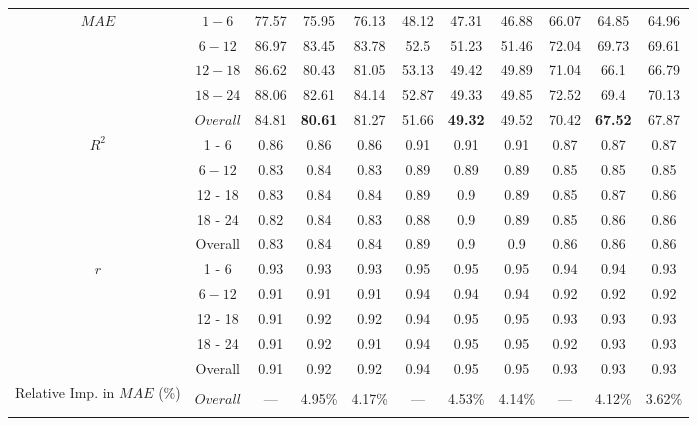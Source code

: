 \begin{table}[h]
\begin{center}
\begin{tabular}{@{}ccccccccccc@{}}
    \midrule
    \multirow{5}{*}{$MAE$}  & $1 - 6$  & 77.57 & 75.95 & 76.13 & 48.12 & 47.31 & 46.88 & 66.07 & 64.85 & 64.96 \\
           & $6 - 12$       & 86.97 & 83.45 & 83.78 & 52.5  & 51.23 & 51.46 & 72.04 & 69.73 & 69.61 \\
           & $12 - 18$      & 86.62 & 80.43 & 81.05 & 53.13 & 49.42 & 49.89 & 71.04 & 66.1  & 66.79 \\
           & $18 - 24$      & 88.06 & 82.61 & 84.14 & 52.87 & 49.33 & 49.85 & 72.52 & 69.4  & 70.13 \\
           & $Overall$      & 84.81 & \textbf{80.61} & 81.27 & 51.66 & \textbf{49.32} & 49.52 & 70.42 & \textbf{67.52} & 67.87 \\
    \midrule
    \multirow{5}{*}{$R^2$}  & 1 - 6 & 0.86  & 0.86  & 0.86  & 0.91  & 0.91  & 0.91  & 0.87  & 0.87  & 0.87 \\
           & $6 - 12$   & 0.83  & 0.84  & 0.83  & 0.89  & 0.89  & 0.89  & 0.85  & 0.85  & 0.85 \\
           & 12 - 18    & 0.83  & 0.84  & 0.84  & 0.89  & 0.9   & 0.89  & 0.85  & 0.87  & 0.86 \\
           & 18 - 24    & 0.82  & 0.84  & 0.83  & 0.88  & 0.9   & 0.89  & 0.85  & 0.86  & 0.86 \\
           & Overall    & 0.83  & 0.84  & 0.84  & 0.89  & 0.9   & 0.9   & 0.86  & 0.86  & 0.86 \\                     
    \midrule
    \multirow{5}{*}{$r$}  & 1 - 6 & 0.93  & 0.93  & 0.93  & 0.95  & 0.95  & 0.95  & 0.94  & 0.94  & 0.93 \\
           & $6 - 12$   & 0.91  & 0.91  & 0.91  & 0.94  & 0.94  & 0.94  & 0.92  & 0.92  & 0.92 \\
           & 12 - 18    & 0.91  & 0.92  & 0.92  & 0.94  & 0.95  & 0.95  & 0.93  & 0.93  & 0.93 \\
           & 18 - 24    & 0.91  & 0.92  & 0.91  & 0.94  & 0.95  & 0.95  & 0.92  & 0.93  & 0.93 \\
           & Overall    & 0.91  & 0.92  & 0.92  & 0.94  & 0.95  & 0.95  & 0.93  & 0.93  & 0.93 \\                     
    \bottomrule
    \multirow{3}{5em}{Relative Imp. in $MAE$ (\%)} & & & & & & & & & & \\
    & $Overall$ & --- & 4.95\% & 4.17\% & --- & 4.53\% & 4.14\% & --- & 4.12\% & 3.62\% \\ 
    & & & & & & & & & &\\ 
    
    \bottomrule
    \end{tabular}
\end{center}
\end{table}

